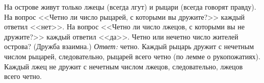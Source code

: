\problem
На острове живут только лжецы (всегда лгут) и рыцари (всегда говорят правду).
На вопрос <<Четно ли число рыцарей, с которыми вы дружите?>> каждый ответил
<<нет>>.
На вопрос <<Четно ли число лжецов, с которыми вы не дружите?>> каждый ответил
<<да>>.
Четно или нечетно число жителей острова?
(Дружба взаимна.)
\solution
\emph{Ответ:} четно.
Каждый рыцарь дружит с нечетным числом рыцарей, следовательно, рыцарей всего
четно (по лемме о рукопожатиях).
Каждый лжец не дружит с нечетным числом лжецов, следовательно, лжецов всего
четно.
\endproblem
